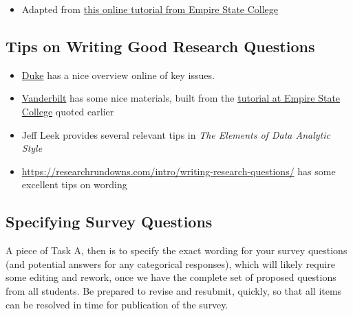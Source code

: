 \documentclass[]{book}
\providecommand{\tightlist}{%
  \setlength{\itemsep}{0pt}\setlength{\parskip}{0pt}}
\theoremstyle{definition}
\theoremstyle{definition}
\theoremstyle{definition}
\theoremstyle{remark}
\begin{document}
\begin{itemize}
\tightlist
\item
  Adapted from
  \href{http://www8.esc.edu/htmlpages/writerold/menus.htm\#develop}{this
  online tutorial from Empire State College}
\end{itemize}

\hypertarget{tips-on-writing-good-research-questions}{%
\subsection{Tips on Writing Good Research
Questions}\label{tips-on-writing-good-research-questions}}

\begin{itemize}
\tightlist
\item
  \href{http://twp.duke.edu/uploads/media_items/research-questions.original.pdf}{Duke}
  has a nice overview online of key issues.
\item
  \href{http://vanderbilt.edu/writing/manage/wp-content/uploads/2013/06/Formulating\%20Your\%20Research\%20Question.pdf}{Vanderbilt}
  has some nice materials, built from the
  \href{http://www8.esc.edu/htmlpages/writerold/menus.htm\#develop}{tutorial
  at Empire State College} quoted earlier
\item
  Jeff Leek provides several relevant tips in \emph{The Elements of Data
  Analytic Style}
\item
  \url{https://researchrundowns.com/intro/writing-research-questions/}
  has some excellent tips on wording
\end{itemize}

\hypertarget{specifying-survey-questions}{%
\subsection{Specifying Survey
Questions}\label{specifying-survey-questions}}

A piece of Task A, then is to specify the exact wording for your survey
questions (and potential answers for any categorical responses), which
will likely require some editing and rework, once we have the complete
set of proposed questions from all students. Be prepared to revise and
resubmit, quickly, so that all items can be resolved in time for
publication of the survey.
\end{document}
